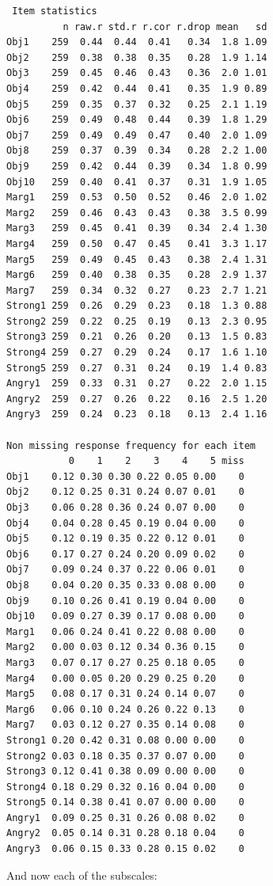 \documentclass[
  english,
]{book}
\begin{document}
\begin{verbatim}
 Item statistics 
          n raw.r std.r r.cor r.drop mean   sd
Obj1    259  0.44  0.44  0.41   0.34  1.8 1.09
Obj2    259  0.38  0.38  0.35   0.28  1.9 1.14
Obj3    259  0.45  0.46  0.43   0.36  2.0 1.01
Obj4    259  0.42  0.44  0.41   0.35  1.9 0.89
Obj5    259  0.35  0.37  0.32   0.25  2.1 1.19
Obj6    259  0.49  0.48  0.44   0.39  1.8 1.29
Obj7    259  0.49  0.49  0.47   0.40  2.0 1.09
Obj8    259  0.37  0.39  0.34   0.28  2.2 1.00
Obj9    259  0.42  0.44  0.39   0.34  1.8 0.99
Obj10   259  0.40  0.41  0.37   0.31  1.9 1.05
Marg1   259  0.53  0.50  0.52   0.46  2.0 1.02
Marg2   259  0.46  0.43  0.43   0.38  3.5 0.99
Marg3   259  0.45  0.41  0.39   0.34  2.4 1.30
Marg4   259  0.50  0.47  0.45   0.41  3.3 1.17
Marg5   259  0.49  0.45  0.43   0.38  2.4 1.31
Marg6   259  0.40  0.38  0.35   0.28  2.9 1.37
Marg7   259  0.34  0.32  0.27   0.23  2.7 1.21
Strong1 259  0.26  0.29  0.23   0.18  1.3 0.88
Strong2 259  0.22  0.25  0.19   0.13  2.3 0.95
Strong3 259  0.21  0.26  0.20   0.13  1.5 0.83
Strong4 259  0.27  0.29  0.24   0.17  1.6 1.10
Strong5 259  0.27  0.31  0.24   0.19  1.4 0.83
Angry1  259  0.33  0.31  0.27   0.22  2.0 1.15
Angry2  259  0.27  0.26  0.22   0.16  2.5 1.20
Angry3  259  0.24  0.23  0.18   0.13  2.4 1.16

Non missing response frequency for each item
           0    1    2    3    4    5 miss
Obj1    0.12 0.30 0.30 0.22 0.05 0.00    0
Obj2    0.12 0.25 0.31 0.24 0.07 0.01    0
Obj3    0.06 0.28 0.36 0.24 0.07 0.00    0
Obj4    0.04 0.28 0.45 0.19 0.04 0.00    0
Obj5    0.12 0.19 0.35 0.22 0.12 0.01    0
Obj6    0.17 0.27 0.24 0.20 0.09 0.02    0
Obj7    0.09 0.24 0.37 0.22 0.06 0.01    0
Obj8    0.04 0.20 0.35 0.33 0.08 0.00    0
Obj9    0.10 0.26 0.41 0.19 0.04 0.00    0
Obj10   0.09 0.27 0.39 0.17 0.08 0.00    0
Marg1   0.06 0.24 0.41 0.22 0.08 0.00    0
Marg2   0.00 0.03 0.12 0.34 0.36 0.15    0
Marg3   0.07 0.17 0.27 0.25 0.18 0.05    0
Marg4   0.00 0.05 0.20 0.29 0.25 0.20    0
Marg5   0.08 0.17 0.31 0.24 0.14 0.07    0
Marg6   0.06 0.10 0.24 0.26 0.22 0.13    0
Marg7   0.03 0.12 0.27 0.35 0.14 0.08    0
Strong1 0.20 0.42 0.31 0.08 0.00 0.00    0
Strong2 0.03 0.18 0.35 0.37 0.07 0.00    0
Strong3 0.12 0.41 0.38 0.09 0.00 0.00    0
Strong4 0.18 0.29 0.32 0.16 0.04 0.00    0
Strong5 0.14 0.38 0.41 0.07 0.00 0.00    0
Angry1  0.09 0.25 0.31 0.26 0.08 0.02    0
Angry2  0.05 0.14 0.31 0.28 0.18 0.04    0
Angry3  0.06 0.15 0.33 0.28 0.15 0.02    0
\end{verbatim}

And now each of the subscales:
\end{document}
